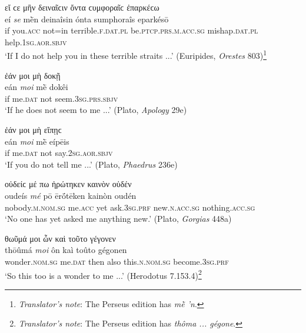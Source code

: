 \begin{exe}
\ex εἴ ϲε μἢν δειναῖϲιν ὄντα ϲυμφοραῖϲ ἐπαρκέϲω\\
\gll eí \emph{se} mḕn deinaîsin ónta sumphoraîs eparkésō\\
if you.\textsc{acc} not=in terrible.\textsc{f.dat.pl} be.\textsc{ptcp.prs.m.acc.sg} mishap.\textsc{dat.pl} help.\textsc{1sg.aor.sbjv}\\
\trans `If I do not help you in these terrible straits ...' (Euripides, \textit{Orestes} 803)\footnote{\emph{Translator's note}: The Perseus edition has \textit{mḕ 'n}.}
\label{pronsep3}
\end{exe}

\begin{exe}
\ex ἐάν μοι μὴ δοκῇ\\
\gll eán \emph{moi} mḕ dokêi\\
if me.\textsc{dat} not seem.\textsc{3sg.prs.sbjv}\\
\trans `If he does not seem to me ...' (Plato, \textit{Apology} 29e)
\label{pronsep4}
\end{exe}

\begin{exe}
\ex ἐάν μοι μὴ εἴπῃϲ\\
\gll eán \emph{moi} mḕ eípēis\\
if me.\textsc{dat} not say.\textsc{2sg.aor.sbjv}\\
\trans `If you do not tell me ...' (Plato, \textit{Phaedrus} 236e)
\label{pronsep5}
\end{exe}

\begin{exe}
\ex οὐδείϲ μέ πω ἠρώτηκεν καινὸν οὐδέν\\
\gll oudeís \emph{mé} pō ērṓtēken kainòn oudén\\
nobody.\textsc{m.nom.sg} me.\textsc{acc} yet ask.\textsc{3sg.prf}
new.\textsc{n.acc.sg} nothing.\textsc{acc.sg}\\
\trans `No one has yet asked me anything new.' (Plato, \textit{Gorgias} 448a)
\label{pronsep6}
\end{exe}

\begin{exe}
\ex θωῦμά μοι ὦν καὶ τοῦτο γέγονεν\\
\gll thōûmá \emph{moi} ôn kaì toûto gégonen\\
wonder.\textsc{nom.sg} me.\textsc{dat} then also this.\textsc{n.nom.sg} become.\textsc{3sg.prf}\\
\trans `So this too is a wonder to me ...' (Herodotus 7.153.4)\footnote{\emph{Translator's note}: The Perseus edition has \textit{thôma ... gégone}.}
\label{pronsep7}
\end{exe}

